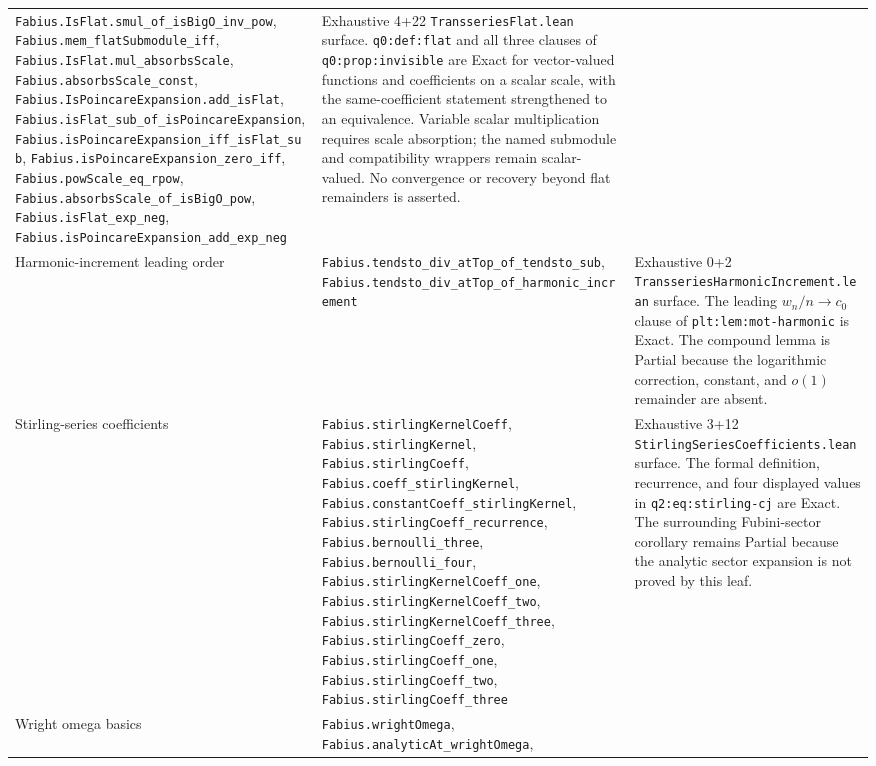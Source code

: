 \documentclass[11pt,oneside]{article}
\theoremstyle{definition}
\theoremstyle{remark}
\begin{document}
\begin{longtable}{@{}>{\raggedright\arraybackslash}p{} >{\raggedright\arraybackslash}p{} >{\raggedright\arraybackslash}p{}@{}}
\nolinkurl{Fabius.IsFlat.smul_of_isBigO_inv_pow},
\nolinkurl{Fabius.mem_flatSubmodule_iff},
\nolinkurl{Fabius.IsFlat.mul_absorbsScale},
\nolinkurl{Fabius.absorbsScale_const},
\nolinkurl{Fabius.IsPoincareExpansion.add_isFlat},
\nolinkurl{Fabius.isFlat_sub_of_isPoincareExpansion},
\nolinkurl{Fabius.isPoincareExpansion_iff_isFlat_sub},
\nolinkurl{Fabius.isPoincareExpansion_zero_iff},
\nolinkurl{Fabius.powScale_eq_rpow},
\nolinkurl{Fabius.absorbsScale_of_isBigO_pow},
\nolinkurl{Fabius.isFlat_exp_neg},
\nolinkurl{Fabius.isPoincareExpansion_add_exp_neg} & Exhaustive 4+22
\nolinkurl{TransseriesFlat.lean} surface.  \nolinkurl{q0:def:flat} and all
three clauses of \nolinkurl{q0:prop:invisible} are Exact for vector-valued
functions and coefficients on a scalar scale, with the same-coefficient
statement strengthened to an equivalence.  Variable scalar multiplication
requires scale absorption; the named submodule and compatibility wrappers
remain scalar-valued.  No convergence or recovery beyond flat remainders is
asserted. \\
Harmonic-increment leading order &
\nolinkurl{Fabius.tendsto_div_atTop_of_tendsto_sub},
\nolinkurl{Fabius.tendsto_div_atTop_of_harmonic_increment} & Exhaustive 0+2
\nolinkurl{TransseriesHarmonicIncrement.lean} surface.  The leading
\(w_n/n\to c_0\) clause of \nolinkurl{plt:lem:mot-harmonic} is Exact.  The
compound lemma is Partial because the logarithmic correction, constant, and
\(o(1)\) remainder are absent. \\
Stirling-series coefficients &
\nolinkurl{Fabius.stirlingKernelCoeff},
\nolinkurl{Fabius.stirlingKernel}, \nolinkurl{Fabius.stirlingCoeff},
\nolinkurl{Fabius.coeff_stirlingKernel},
\nolinkurl{Fabius.constantCoeff_stirlingKernel},
\nolinkurl{Fabius.stirlingCoeff_recurrence},
\nolinkurl{Fabius.bernoulli_three},
\nolinkurl{Fabius.bernoulli_four},
\nolinkurl{Fabius.stirlingKernelCoeff_one},
\nolinkurl{Fabius.stirlingKernelCoeff_two},
\nolinkurl{Fabius.stirlingKernelCoeff_three},
\nolinkurl{Fabius.stirlingCoeff_zero},
\nolinkurl{Fabius.stirlingCoeff_one},
\nolinkurl{Fabius.stirlingCoeff_two},
\nolinkurl{Fabius.stirlingCoeff_three} & Exhaustive 3+12
\nolinkurl{StirlingSeriesCoefficients.lean} surface.  The formal definition,
recurrence, and four displayed values in \nolinkurl{q2:eq:stirling-cj} are
Exact.  The surrounding Fubini-sector corollary remains Partial because the
analytic sector expansion is not proved by this leaf. \\
Wright omega basics &
\nolinkurl{Fabius.wrightOmega},
\nolinkurl{Fabius.analyticAt_wrightOmega},

\end{longtable}
\end{document}
